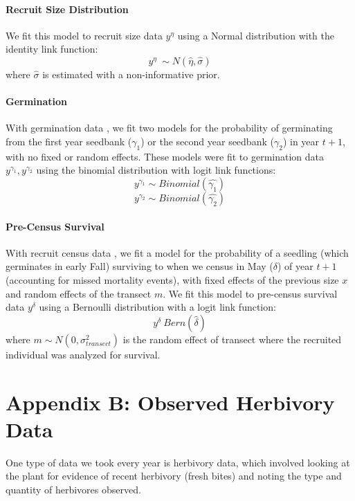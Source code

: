 \documentclass[11pt]{article}
\begin{document}
\paragraph{Recruit Size Distribution}
We fit this model to recruit size data $y^{\eta}$ using a Normal distribution with the identity link function: 
$$y^{\eta} ~\sim N(\hat{\eta},\hat{\sigma})$$
where $\hat{\sigma}$ is estimated with a non-informative prior. 

\paragraph{Germination}
With germination data \cite{Miller2007}, we fit two models for the probability of germinating from the first year seedbank ($\gamma_1$) or the second year seedbank ($\gamma_2$) in year $t+1$, with no fixed or random effects.
These models were fit to germination data $y^{\gamma_1}, y^{\gamma_2}$  using the binomial distribution with logit link functions:
$$y^{\gamma_1} \sim Binomial(\hat{\gamma_1})$$
$$y^{\gamma_2} \sim Binomial(\hat{\gamma_2})$$

\paragraph{Pre-Census Survival}
With recruit census data \cite{Miller2006}, we fit a model for the probability of a seedling (which germinates in early Fall) surviving to when we census in May ($\delta$) of year $t+1$ (accounting for missed mortality events), with fixed effects of the previous size $x$ and random effects of the transect $m$.
We fit this model to pre-census survival data $y^{\delta}$ using a Bernoulli distribution with a logit link function: 
$$y^{\delta} ~ Bern(\hat{\delta})$$
where $m \sim N(0, \sigma_{transect}^2)$ is the random effect of transect where the recruited individual was analyzed for survival.


\section*{Appendix B: Observed Herbivory Data}
One type of data we took every year is herbivory data, which involved looking at the plant for evidence of recent herbivory (fresh bites) and noting the type and quantity of herbivores observed.
\end{document}
